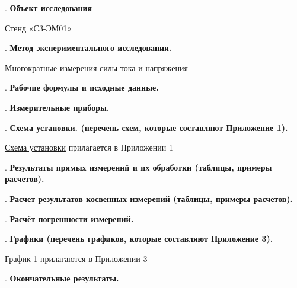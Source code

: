 \documentclass[12pt]{article}
\begin{document}
    \mediumvspace

    . \textbf{Объект исследования} 
    
    Стенд «С3-ЭМ01»

    \mediumvspace

    . \textbf{Метод экспериментального исследования.}

    Многократные измерения силы тока и напряжения

    \mediumvspace

    . \textbf{Рабочие формулы и исходные данные.}

    

    \mediumvspace

    \clearpage

    . \textbf{Измерительные приборы.}

    \smallvspace

    

    \mediumvspace

    . \textbf{Схема установки. (перечень схем, которые составляют Приложение 1).}

    \hyperlink{schema1}{Схема установки} прилагается в Приложении 1

    \mediumvspace

    . \textbf{Результаты прямых измерений и их обработки (таблицы, примеры расчетов).}

    

    \mediumvspace

    . \textbf{Расчет результатов косвенных измерений (таблицы, примеры расчетов).}

    

    \mediumvspace

    . \textbf{Расчёт погрешности измерений.}

    

    \mediumvspace

    . \textbf{Графики (перечень графиков, которые составляют Приложение 3).}

    \hyperlink{diagram1}{График 1} прилагаются в Приложении 3

    \mediumvspace

    . \textbf{Окончательные результаты.}

    
\end{document}
